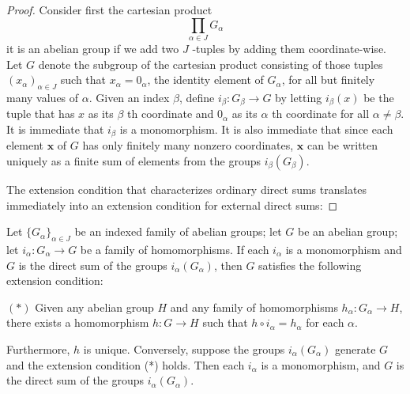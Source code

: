 \begin{proof}
Consider first the cartesian product
\[
\mathop{\prod }\limits_{{\alpha \in J}}G_{\alpha }
\]
it is an abelian group if we add two \(J\) -tuples by adding them coordinate-wise. Let \(G\) denote the subgroup of the cartesian product consisting of those tuples \({( x_{\alpha }) }_{\alpha \in J}\) such that \(x_{\alpha } = 0_{\alpha }\), the identity element of \(G_{\alpha }\), for all but finitely many values of \(\alpha\). Given an index \(\beta\), define \(i_{\beta } : G_{\beta } \rightarrow G\) by letting \(i_{\beta }(x)\) be the tuple that has \(x\) as its \(\beta\) th coordinate and \(0_{\alpha }\) as its \(\alpha\) th coordinate for all \(\alpha \neq \beta\). It is immediate that \(i_{\beta }\) is a monomorphism. It is also immediate that since each element \(\mathbf{x}\) of \(G\) has only finitely many nonzero coordinates, \(\mathbf{x}\) can be written uniquely as a finite sum of elements from the groups \(i_{\beta }( G_{\beta })\).

The extension condition that characterizes ordinary direct sums translates immediately into an extension condition for external direct sums:
\end{proof}
\begin{lemma}
\label{lem:\thetheorem}
Let \({\{ G_{\alpha }\} }_{\alpha \in J}\) be an indexed family of abelian groups; let \(G\) be an abelian group; let \(i_{\alpha } : G_{\alpha } \rightarrow G\) be a family of homomorphisms. If each \(i_{\alpha }\) is a monomorphism and \(G\) is the direct sum of the groups \(i_{\alpha }( G_{\alpha })\), then \(G\) satisfies the following extension condition:

\((*)\) Given any abelian group \(H\) and any family of homomorphisms \(h_{\alpha } : G_{\alpha } \rightarrow H\), there exists a homomorphism \(h : G \rightarrow H\) such that \(h \circ {i}_{\alpha } = h_{\alpha }\) for each \(\alpha\).

Furthermore, \(h\) is unique. Conversely, suppose the groups \(i_{\alpha }( G_{\alpha })\) generate \(G\) and the extension condition (*) holds. Then each \(i_{\alpha }\) is a monomorphism, and \(G\) is the direct sum of the groups \(i_{\alpha }( G_{\alpha })\).
\end{lemma}

